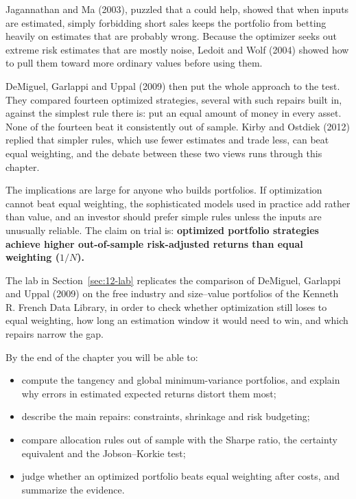 Jagannathan and Ma (2003), puzzled that a  could help, showed that when inputs are estimated, simply forbidding short sales keeps the portfolio from betting heavily on estimates that are probably wrong. Because the optimizer seeks out extreme risk estimates that are mostly noise, Ledoit and Wolf (2004) showed how to pull them toward more ordinary values before using them. 

DeMiguel, Garlappi and Uppal (2009) then put the whole approach to the test. They compared fourteen optimized strategies, several with such repairs built in, against the simplest rule there is: put an equal amount of money in every asset. None of the fourteen beat it consistently out of sample. Kirby and Ostdiek (2012) replied that simpler rules, which use fewer estimates and trade less, can beat equal weighting, and the debate between these two views runs through this chapter.

The implications are large for anyone who builds portfolios. If optimization cannot beat equal weighting, the sophisticated models used in practice add  rather than value, and an investor should prefer simple rules unless the inputs are unusually reliable. The claim on trial is: \textbf{optimized portfolio strategies achieve higher out-of-sample risk-adjusted returns than equal weighting ($1/N$).}

The lab in Section~\ref{sec:12-lab} replicates the comparison of DeMiguel, Garlappi and Uppal (2009) on the free industry and size--value portfolios of the Kenneth R. French Data Library, in order to check whether optimization still loses to equal weighting, how long an estimation window it would need to win, and which repairs narrow the gap.

By the end of the chapter you will be able to:

\begin{itemize}
  \item compute the tangency and global minimum-variance portfolios, and explain why errors in estimated expected returns distort them most;
  \item describe the main repairs: constraints, shrinkage and risk budgeting;
  \item compare allocation rules out of sample with the Sharpe ratio, the certainty equivalent and the Jobson--Korkie test;
  \item judge whether an optimized portfolio beats equal weighting after costs, and summarize the evidence.
\end{itemize}



